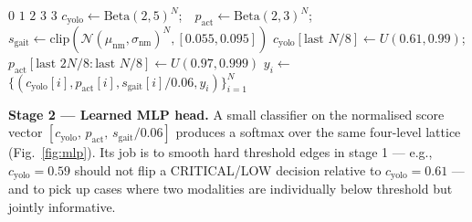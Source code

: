\documentclass[runningheads]{llncs}
\begin{document}
\begin{algorithm}[!htbp]
\caption{Two-stage fusion: (i) the rule cascade that produces $\ell_\text{rule}$ from the score triple, and (ii) the synthetic-bootstrap procedure that generates labelled training data for the MLP head.}
\label{alg:fusion}
\begin{algorithmic}[1]
\label{alg:cascade}
  \Statex {}
   \State \Return $0$ 
   \State \Return $1$ 
   \State \Return $2$ 
   \State \Return $3$ 
  \Else \State \Return $3$ 
  \EndIf
\EndProcedure
\Statex
{}\label{alg:bootstrap}
  \State $c_\text{yolo} \!\gets\! \text{Beta}(2,5)^N$;\ \  $p_\text{act} \!\gets\! \text{Beta}(2,3)^N$;\ \  $s_\text{gait} \!\gets\! \text{clip}(\mathcal{N}(\mu_\text{nm},\sigma_\text{nm})^N, [0.055, 0.095])$
  \State $c_\text{yolo}[\text{last } N/8] \gets U(0.61, 0.99)$;\quad $p_\text{act}[\text{last } 2N/8\!:\!\text{last } N/8] \gets U(0.97, 0.999)$ 
   \State $y_i \gets$  \EndFor
  \State \Return $\{(c_\text{yolo}[i], p_\text{act}[i], s_\text{gait}[i]/0.06, y_i)\}_{i=1}^{N}$
\EndProcedure
\end{algorithmic}
\end{algorithm}

\textbf{Stage 2 --- Learned MLP head.} A small classifier on the normalised score vector $[c_\text{yolo},\,p_\text{act},\,s_\text{gait}/0.06]$ produces a softmax over the same four-level lattice (Fig.~\ref{fig:mlp}). Its job is to smooth hard threshold edges in stage 1 --- e.g., $c_\text{yolo} = 0.59$ should not flip a CRITICAL/LOW decision relative to $c_\text{yolo} = 0.61$ --- and to pick up cases where two modalities are individually below threshold but jointly informative.
\end{document}
